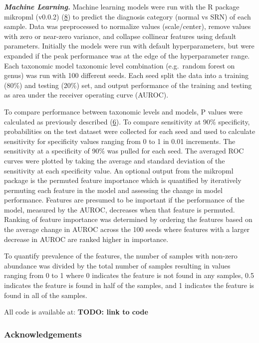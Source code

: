 \documentclass[
]{article}
\begin{document}
\textbf{\emph{Machine Learning.}} Machine learning models were run with
the R package mikropml (v0.0.2)
(\protect\hyperlink{ref-topuxe7uolu2021}{8}) to predict the diagnosis
category (normal vs SRN) of each sample. Data was preprocessed to
normalize values (scale/center), remove values with zero or near-zero
variance, and collapse collinear features using default parameters.
Initially the models were run with default hyperparameters, but were
expanded if the peak performance was at the edge of the hyperparameter
range. Each taxonomic model taxonomic level combination (e.g.~random
forest on genus) was run with 100 different seeds. Each seed split the
data into a training (80\%) and testing (20\%) set, and output
performance of the training and testing as area under the receiver
operating curve (AUROC).

To compare performance between taxonomic levels and models, P values
were calculated as previously described
(\protect\hyperlink{ref-topuxe7uolu2020}{6}). To compare sensitivity at
90\% specificity, probabilities on the test dataset were collected for
each seed and used to calculate sensitivity for specificity values
ranging from 0 to 1 in 0.01 increments. The sensitivity at a specificity
of 90\% was pulled for each seed. The averaged ROC curves were plotted
by taking the average and standard deviation of the sensitivity at each
specificity value. An optional output from the mikropml package is the
permuted feature importance which is quantified by iteratively permuting
each feature in the model and assessing the change in model performance.
Features are presumed to be important if the performance of the model,
measured by the AUROC, decreases when that feature is permuted. Ranking
of feature importance was determined by ordering the features based on
the average change in AUROC across the 100 seeds where features with a
larger decrease in AUROC are ranked higher in importance.

To quantify prevalence of the features, the number of samples with
non-zero abundance was divided by the total number of samples resulting
in values ranging from 0 to 1 where 0 indicates the feature is not found
in any samples, 0.5 indicates the feature is found in half of the
samples, and 1 indicates the feature is found in all of the samples.

All code is available at: \textbf{TODO: link to code}

\hypertarget{acknowledgements}{%
\subsubsection{Acknowledgements}\label{acknowledgements}}
\end{document}

